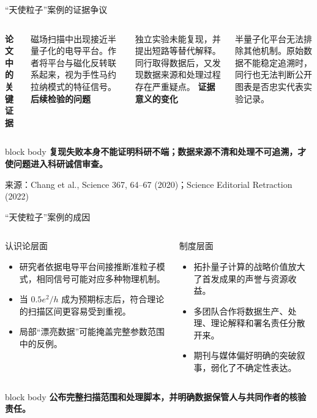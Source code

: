 \documentclass[aspectratio=169,10pt]{ctexbeamer}
\newcommand{\key}[1]{\textcolor{DeepBlue}{\textbf{#1}}}
\newcommand{\source}[1]{%
  \par\vfill\begingroup\color{Muted}\fontsize{5.8}{7}\selectfont 来源：#1\endgroup
}
\newcommand{\takeaway}[1]{%
  \begin{beamercolorbox}[rounded=true,sep=0.65em,wd=\linewidth]{block body}
    \centering\color{MutedBlue}\textbf{#1}
  \end{beamercolorbox}
}
\begin{document}
\begin{frame}{“天使粒子”案例的证据争议}
  \begin{columns}[T,onlytextwidth]
      \key{论文中的关键证据}
      \vspace{0.15cm}

      磁场扫描中出现接近半量子化的电导平台。作者将平台与磁化反转联系起来，视为手性马约拉纳模式的特征信号。
      \key{后续检验的问题}
      \vspace{0.15cm}

      独立实验未能复现，并提出短路等替代解释。同行取得数据后，又发现数据来源和处理过程存在严重疑点。
      \key{证据意义的变化}
      \vspace{0.15cm}

      半量子化平台无法排除其他机制。原始数据不能稳定追溯时，同行也无法判断公开图表是否忠实代表实验记录。
  \end{columns}

  \vspace{0.45cm}
  \takeaway{复现失败本身不能证明科研不端；数据来源不清和处理不可追溯，才使问题进入科研诚信审查。}
  \source{Chang et al., Science 367, 64--67 (2020)；Science Editorial Retraction (2022)}
\end{frame}

\begin{frame}{“天使粒子”案例的成因}
  \begin{columns}[T,onlytextwidth]
      \begin{block}{认识论层面}
        \begin{itemize}
          \item 研究者依据电导平台间接推断准粒子模式，相同信号可能对应多种物理机制。
          \item 当 $0.5e^2/h$ 成为预期标志后，符合理论的扫描区间更容易受到重视。
          \item 局部“漂亮数据”可能掩盖完整参数范围中的反例。
        \end{itemize}
      \end{block}
      \begin{block}{制度层面}
        \begin{itemize}
          \item 拓扑量子计算的战略价值放大了首发成果的声誉与资源收益。
          \item 多团队合作将数据生产、处理、理论解释和署名责任分散开来。
          \item 期刊与媒体偏好明确的突破叙事，弱化了不确定性表达。
        \end{itemize}
      \end{block}
  \end{columns}

  \vspace{0.35cm}
  \takeaway{公布完整扫描范围和处理脚本，并明确数据保管人与共同作者的核验责任。}
\end{frame}
\end{document}
